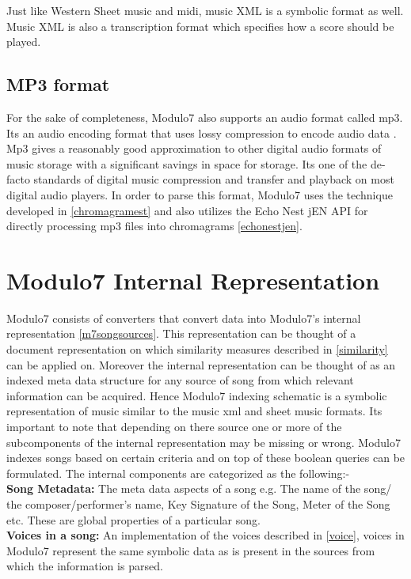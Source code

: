 \noindent Just like Western Sheet music and midi, music XML is a symbolic format as well. Music XML is also a transcription format which specifies how a score should be played. 

\subsection{MP3 format} \label{mp3format}
\noindent For the sake of completeness, Modulo7 also supports an audio format called mp3. Its an audio encoding format that uses lossy compression to encode audio data \cite{mp3specification}. Mp3 gives a reasonably good approximation to other digital audio formats of music storage with a significant savings in space for storage. Its one of the de-facto standards of digital music compression and transfer and playback on most digital audio players. In order to parse this format, Modulo7 uses the technique developed in \ref{chromagramest} and also utilizes the Echo Nest jEN API for directly processing mp3 files into chromagrams \ref{echonestjen}. 

\section{Modulo7 Internal Representation}

\noindent Modulo7 consists of converters that convert data into Modulo7's internal representation \ref{m7songsources}. This representation can be thought of a document representation on which similarity measures described in \ref{similarity} can be applied on. Moreover the internal representation can be thought of as an indexed meta data structure for any source of song from which relevant information can be acquired. Hence Modulo7 indexing schematic is a symbolic representation of music similar to the music xml and sheet music formats. Its important to note that depending on there source one or more of the subcomponents of the internal representation may be missing or wrong. Modulo7 indexes songs based on certain criteria and on top of these boolean queries can be formulated. The internal components are categorized as the following:-\\

\noindent \textbf{Song Metadata:} The meta data aspects of a song e.g. The name of the song/ the composer/performer's name, Key Signature of the Song, Meter of the Song etc. These are global properties of a particular song. \\

\noindent \textbf{Voices in a song:} An implementation of the voices described in \ref{voice}, voices in Modulo7 represent the same symbolic data as is present in the sources from which the information is parsed.\\

